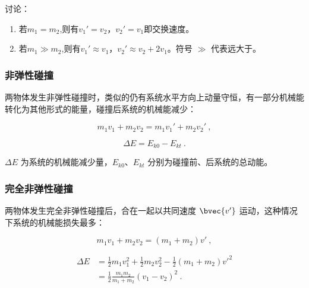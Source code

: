 讨论：
\begin{enumerate}
\item 若$m_1=m_2$,则有$v_1'=v_2$，$v_2'=v_1$即交换速度。
\item 若$m_1\gg m_2$,则有$v_1'\approx v_1$，$v_2'\approx v_2+2v_1$。符号 $\gg$ 代表远大于。
\end{enumerate}

\subsubsection{非弹性碰撞}

两物体发生非弹性碰撞时，类似的仍有系统水平方向上动量守恒，有一部分机械能转化为其他形式的能量，碰撞后系统的机械能减少：

\begin{equation}
m_1v_1+m_2v_2=m_1v_1'+m_2v_2'~,
\end{equation}

\begin{equation}
\Delta E = E_{k0}-E_{kt}~.
\end{equation}

$\Delta E$ 为系统的机械能减少量，$E_{k0}$、$ E_{kt}$ 分别为碰撞前、后系统的总动能。

\subsubsection{完全非弹性碰撞}

两物体发生完全非弹性碰撞后，合在一起以共同速度 $\bvec {v'}$ 运动，这种情况下系统的机械能损失最多：

\begin{equation}
m_1v_1+m_2v_2=(m_1+m_2)v'~,
\end{equation}

\begin{equation}
\begin{aligned}
\Delta E&=\frac12m_1v_1^2+\frac12m_2v_2^2-\frac12(m_1+m_2)v'^2\\
&=\frac{1}{2}\frac{m_1m_2}{m_1+m_2}\left(v_1-v_2\right)^2~.\\
\end{aligned}
\end{equation}



